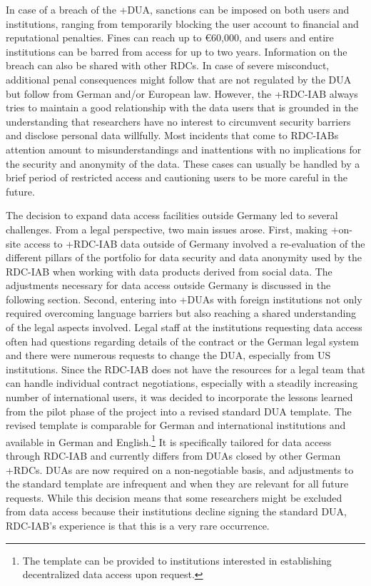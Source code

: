 \documentclass[
]{WileySix}
\begin{document}
In case of a breach of the +DUA\textbar, sanctions can be imposed on both users and institutions, ranging from temporarily blocking the user account to financial and reputational penalties. Fines can reach up to €60,000, and users and entire institutions can be barred from access for up to two years. Information on the breach can also be shared with other RDCs. In case of severe misconduct, additional penal consequences might follow that are not regulated by the DUA but follow from German and/or European law. However, the +RDC-IAB\textbar{} always tries to maintain a good relationship with the data users that is grounded in the understanding that researchers have no interest to circumvent security barriers and disclose personal data willfully. Most incidents that come to RDC-IABs attention amount to misunderstandings and inattentions with no implications for the security and anonymity of the data. These cases can usually be handled by a brief period of restricted access and cautioning users to be more careful in the future.

The decision to expand data access facilities outside Germany led to several challenges. From a legal perspective, two main issues arose. First, making +on-site\textbar{} access to +RDC-IAB\textbar{} data outside of Germany involved a re-evaluation of the different pillars of the portfolio for data security and data anonymity used by the RDC-IAB when working with data products derived from social data. The adjustments necessary for data access outside Germany is discussed in the following section. Second, entering into +DUA\textbar s with foreign institutions not only required overcoming language barriers but also reaching a shared understanding of the legal aspects involved. Legal staff at the institutions requesting data access often had questions regarding details of the contract or the German legal system and there were numerous requests to change the DUA, especially from US institutions. Since the RDC-IAB does not have the resources for a legal team that can handle individual contract negotiations, especially with a steadily increasing number of international users, it was decided to incorporate the lessons learned from the pilot phase of the project into a revised standard DUA template. The revised template is comparable for German and international institutions and available in German and English.\footnote{The template can be provided to institutions interested in establishing decentralized data access upon request.} It is specifically tailored for data access through RDC-IAB and currently differs from DUAs closed by other German +RDC\textbar s. DUAs are now required on a non-negotiable basis, and adjustments to the standard template are infrequent and when they are relevant for all future requests. While this decision means that some researchers might be excluded from data access because their institutions decline signing the standard DUA, RDC-IAB's experience is that this is a very rare occurrence.
\end{document}
